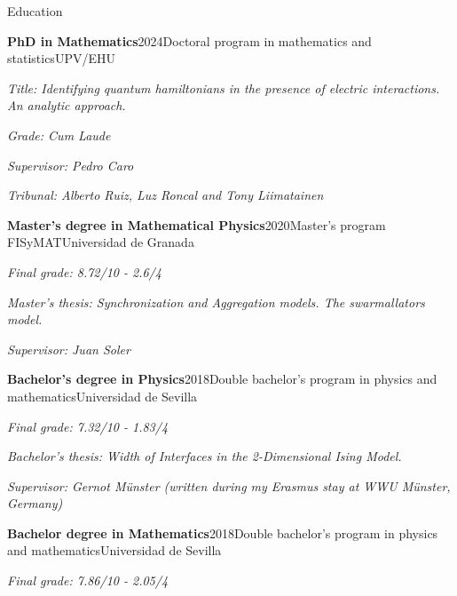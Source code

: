 \documentclass{resume} %
\newcommand{\italicitem}[1]{\item{\textit{#1}}}
\begin{document}
\begin{rSection}{Education}

    \begin{rSubsectionNoBullet}{\bf PhD in Mathematics}{2024}{Doctoral program in mathematics and statistics}{UPV/EHU}
        \italicitem{Title: Identifying quantum hamiltonians in the presence of electric interactions. An analytic approach.}
        \italicitem{Grade: Cum Laude}
        \italicitem{Supervisor: Pedro Caro}
        \italicitem{Tribunal: Alberto Ruiz, Luz Roncal and Tony Liimatainen}
    \end{rSubsectionNoBullet}
    
    \begin{rSubsectionNoBullet}{\bf Master's degree in Mathematical Physics}{2020}{Master's program FISyMAT}{Universidad de Granada}
        \italicitem{Final grade: 8.72/10 - 2.6/4}
        \italicitem{Master's thesis: Synchronization and Aggregation models. The swarmallators model.}
        \italicitem{Supervisor: Juan Soler}
    \end{rSubsectionNoBullet}
    
    \begin{rSubsectionNoBullet}{\bf Bachelor's degree in Physics}{2018}{Double bachelor's program in physics and mathematics}{Universidad de Sevilla}
        \italicitem{Final grade: 7.32/10 - 1.83/4}
        \italicitem{Bachelor's thesis: Width of Interfaces in the 2-Dimensional Ising Model.}
        \italicitem{Supervisor: Gernot M\"unster (written during my Erasmus stay at WWU M\"unster, Germany)}
    \end{rSubsectionNoBullet}

    \begin{rSubsectionNoBullet}{\bf Bachelor degree in Mathematics}{2018}{Double bachelor's program in physics and mathematics}{Universidad de Sevilla}
        \italicitem{Final grade: 7.86/10 - 2.05/4}
    \end{rSubsectionNoBullet}

\end{rSection}
\end{document}
